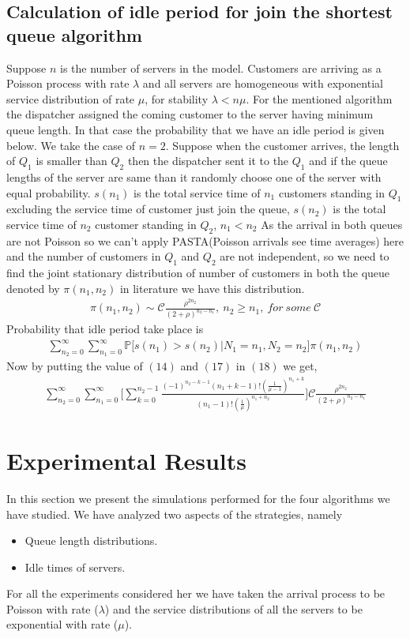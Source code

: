 \documentclass[a4paper,english,11pt]{article}
\begin{document}
\subsection{Calculation of idle period for join the shortest queue algorithm} 
Suppose $n$ is the number of servers in the model. Customers are arriving as a  Poisson process with rate $\lambda$ and all servers are homogeneous with exponential service distribution of rate $\mu$, for stability $\lambda < n\mu$. For the mentioned algorithm the dispatcher assigned the coming customer to the server having minimum queue length. In that case the probability that we have an idle period is given below. We take the case of $n=2$. Suppose when the customer arrives, the length of $Q_1$ is smaller than $Q_2$ then the dispatcher sent it to the $Q_1$ and if the queue lengths of the server are same than it randomly choose one of the server with equal probability. $s(n_1)$ is the total service time of $n_1$ customers standing in $Q_1$ excluding the service time of customer just join the queue, $s(n_2)$ is the total service time of $n_2$ customer standing in $Q_2$, $n_1<n_2$ As the arrival in both queues are not Poisson so we can't apply PASTA(Poisson arrivals see time averages) here and the number of customers in $Q_1$ and $Q_2$ are not independent, so we need to find the joint stationary distribution of number of customers in both the queue denoted by $\pi(n_1,n_2)$ in literature we have this distribution.
\begin{align}
\pi(n_1,n_2) \sim \mathcal{C} \frac{\rho ^{2n_2}}{(2+\rho)^{n_2-n_1}}, \ n_2\geq n_1, \ for \ some \ \mathcal{C}
\end{align}
Probability that idle period take place is 
\begin{align}
\sum_{n_2=0}^{\infty}\sum_{n_1=0}^{\infty} \mathbb{P}\bigg[s(n_1) > s(n_2) | N_1 =n_1, N_2 =n_2\bigg] \pi(n_1,n_2)
\end{align}
Now by putting the value of $(14)$ and $(17)$ in $(18)$ we get,
\begin{align}
 \sum_{n_2=0}^{\infty}\sum_{n_1=0}^{\infty} \bigg[\sum_{k=0}^{n_2-1}\frac{(-1)^{n_2-k-1}(n_1+k-1)!(\frac{1}{\mu-1})^{n_1+k}}{(n_1-1)!(\frac{1}{\mu})^{n_1+   n_2}} \bigg] \mathcal{C} \frac{\rho ^{2n_2}}{(2+\rho)^{n_2-n_1}}
\end{align} 
\section{Experimental Results}
In this section we present the simulations performed for the four algorithms we have studied. We have analyzed two aspects of the strategies, namely
\begin{itemize}
\item Queue length distributions.
\item Idle times of servers.

\end{itemize}
For all the experiments considered her we have taken the arrival process to be Poisson with rate ($\lambda$) and the service distributions of all the servers to be exponential with rate ($\mu$). 
\end{document}

